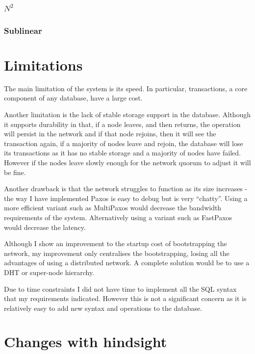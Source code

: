 \documentclass[12pt,twoside,notitlepage]{report}
\begin{document}
\subsubsection{$N^2$}

\subsubsection{Sublinear}



\section{Limitations}

The main limitation of the system is its speed. In particular, transactions, a core component of
any database, have a large cost.

Another limitation is the lack of stable storage support in the database. Although it supports
durability in that, if a node leaves, and then returns, the operation will persist in the network
and if that node rejoins, then it will see the transaction again, if a majority of nodes leave and
rejoin, the database will lose its transactions as it has no stable storage and a majority of
nodes have failed. However if the nodes leave slowly enough for the network quorum to adjust it
will be fine.

Another drawback is that the network struggles to function as its size increases - the way I have
implemented Paxos is easy to debug but is very ``chatty''. Using a more efficient variant such as
MultiPaxos would decrease the bandwidth requirements of the system. Alternatively using a variant
such as FastPaxos would decrease the latency.

Although I show an improvement to the startup cost of bootstrapping the network, my improvement
only centralises the bootstrapping, losing all the advantages of using a distributed network. A
complete solution would be to use a DHT or super-node hierarchy.

Due to time constraints I did not have time to implement all the SQL syntax that my requirements
indicated. However this is not a significant concern as it is relatively easy to add new syntax and
operations to the database.

\section{Changes with hindsight}
\end{document}
